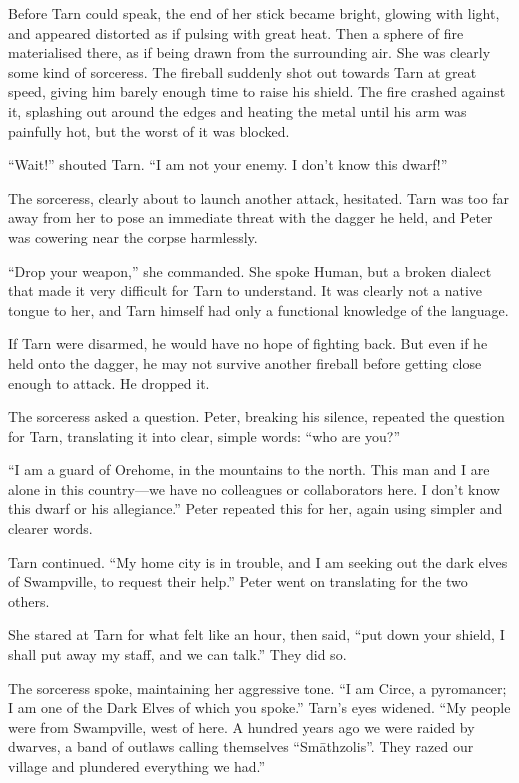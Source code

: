 Before Tarn could speak, the end of her stick became bright, glowing with light, and appeared distorted as if pulsing with great heat.  Then a sphere of fire materialised there, as if being drawn from the surrounding air.  She was clearly some kind of sorceress.  The fireball suddenly shot out towards Tarn at great speed, giving him barely enough time to raise his shield.  The fire crashed against it, splashing out around the edges and heating the metal until his arm was painfully hot, but the worst of it was blocked.

``Wait!'' shouted Tarn.  ``I am not your enemy.  I don't know this dwarf!''

The sorceress, clearly about to launch another attack, hesitated.  Tarn was too far away from her to pose an immediate threat with the dagger he held, and Peter was cowering near the corpse harmlessly.

``Drop your weapon,'' she commanded.  She spoke Human, but a broken dialect that made it very difficult for Tarn to understand. It was clearly not a native tongue to her, and Tarn himself had only a functional knowledge of the language.

If Tarn were disarmed, he would have no hope of fighting back.  But even if he held onto the dagger, he may not survive another fireball before getting close enough to attack.  He dropped it.

The sorceress asked a question.  Peter, breaking his silence, repeated the question for Tarn, translating it into clear, simple words: ``who are you?''

``I am a guard of Orehome, in the mountains to the north.  This man and I are alone in this country---we have no colleagues or collaborators here.  I don't know this dwarf or his allegiance.''  Peter repeated this for her, again using simpler and clearer words.

Tarn continued.  ``My home city is in trouble, and I am seeking out the dark elves of Swampville, to request their help.''  Peter went on translating for the two others.

She stared at Tarn for what felt like an hour, then said, ``put down your shield, I shall put away my staff, and we can talk.''  They did so.

The sorceress spoke, maintaining her aggressive tone.  ``I am Circe, a pyromancer; I am one of the Dark Elves of which you spoke.''  Tarn's eyes widened.  ``My people were from Swampville, west of here.  A hundred years ago we were raided by dwarves, a band of outlaws calling themselves ``Sm\=athzolis''.  They razed our village and plundered everything we had.''

